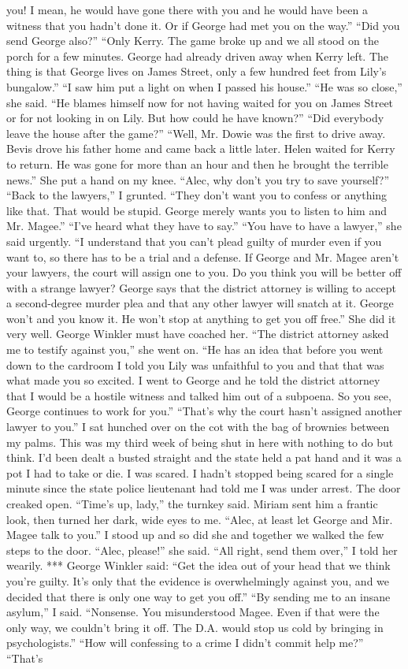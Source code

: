 \documentclass{novel}
\begin{document}
you! I mean, he would have gone there with you and he would have been a witness that you hadn’t done it. Or if George had met you on the way.” “Did you send George also?” “Only Kerry. The game broke up and we all stood on the porch for a few minutes. George had already driven away when Kerry left. The thing is that George lives on James Street, only a few hundred feet from Lily’s bungalow.” “I saw him put a light on when I passed his house.” “He was so close,” she said. “He blames himself now for not having waited for you on James Street or for not looking in on Lily. But how could he have known?” “Did everybody leave the house after the game?” “Well, Mr. Dowie was the first to drive away. Bevis drove his father home and came back a little later. Helen waited for Kerry to return. He was gone for more than an hour and then he brought the terrible news.” She put a hand on my knee. “Alec, why don’t you try to save yourself?” “Back to the lawyers,” I grunted. “They don’t want you to confess or anything like that. That would be stupid. George merely wants you to listen to him and Mr. Magee.” “I’ve heard what they have to say.” “You have to have a lawyer,” she said urgently. “I understand that you can’t plead guilty of murder even if you want to, so there has to be a trial and a defense. If George and Mr. Magee aren’t your lawyers, the court will assign one to you. Do you think you will be better off with a strange lawyer? George says that the district attorney is willing to accept a second-degree murder plea and that any other lawyer will snatch at it. George won’t and you know it. He won’t stop at anything to get you off free.” She did it very well. George Winkler must have coached her. “The district attorney asked me to testify against you,” she went on. “He has an idea that before you went down to the cardroom I told you Lily was unfaithful to you and that that was what made you so excited. I went to George and he told the district attorney that I would be a hostile witness and talked him out of a subpoena. So you see, George continues to work for you.” “That’s why the court hasn’t assigned another lawyer to you.” I sat hunched over on the cot with the bag of brownies between my palms. This was my third week of being shut in here with nothing to do but think. I’d been dealt a busted straight and the state held a pat hand and it was a pot I had to take or die. I was scared. I hadn’t stopped being scared for a single minute since the state police lieutenant had told me I was under arrest. The door creaked open. “Time’s up, lady,” the turnkey said. Miriam sent him a frantic look, then turned her dark, wide eyes to me. “Alec, at least let George and Mir. Magee talk to you.” I stood up and so did she and together we walked the few steps to the door. “Alec, please!” she said. “All right, send them over,” I told her wearily. *** George Winkler said: “Get the idea out of your head that we think you’re guilty. It’s only that the evidence is overwhelmingly against you, and we decided that there is only one way to get you off.” “By sending me to an insane asylum,” I said. “Nonsense. You misunderstood Magee. Even if that were the only way, we couldn’t bring it off. The D.A. would stop us cold by bringing in psychologists.” “How will confessing to a crime I didn’t commit help me?” “That’s 
\end{document}
